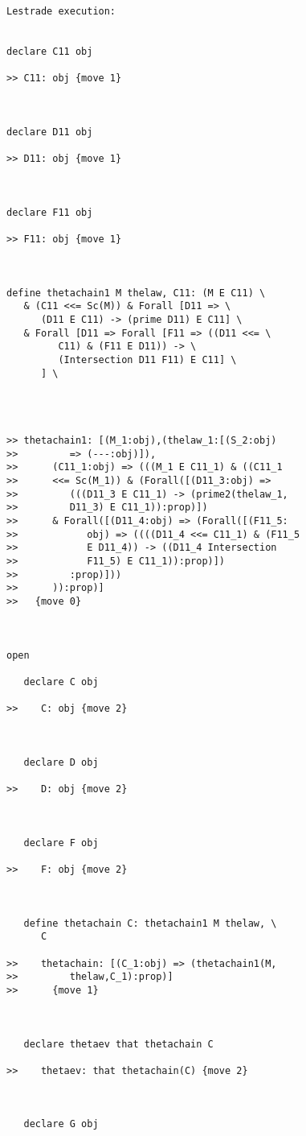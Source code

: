 \documentclass[12pt]{article}
\begin{document}
\begin{verbatim}Lestrade execution:


declare C11 obj

>> C11: obj {move 1}



declare D11 obj

>> D11: obj {move 1}



declare F11 obj

>> F11: obj {move 1}



define thetachain1 M thelaw, C11: (M E C11) \
   & (C11 <<= Sc(M)) & Forall [D11 => \
      (D11 E C11) -> (prime D11) E C11] \
   & Forall [D11 => Forall [F11 => ((D11 <<= \
         C11) & (F11 E D11)) -> \
         (Intersection D11 F11) E C11] \
      ] \
   



>> thetachain1: [(M_1:obj),(thelaw_1:[(S_2:obj)
>>         => (---:obj)]),
>>      (C11_1:obj) => (((M_1 E C11_1) & ((C11_1
>>      <<= Sc(M_1)) & (Forall([(D11_3:obj) =>
>>         (((D11_3 E C11_1) -> (prime2(thelaw_1,
>>         D11_3) E C11_1)):prop)])
>>      & Forall([(D11_4:obj) => (Forall([(F11_5:
>>            obj) => ((((D11_4 <<= C11_1) & (F11_5
>>            E D11_4)) -> ((D11_4 Intersection
>>            F11_5) E C11_1)):prop)])
>>         :prop)]))
>>      )):prop)]
>>   {move 0}



open

   declare C obj

>>    C: obj {move 2}



   declare D obj

>>    D: obj {move 2}



   declare F obj

>>    F: obj {move 2}



   define thetachain C: thetachain1 M thelaw, \
      C

>>    thetachain: [(C_1:obj) => (thetachain1(M,
>>         thelaw,C_1):prop)]
>>      {move 1}



   declare thetaev that thetachain C

>>    thetaev: that thetachain(C) {move 2}



   declare G obj


\end{verbatim}
\end{document}
